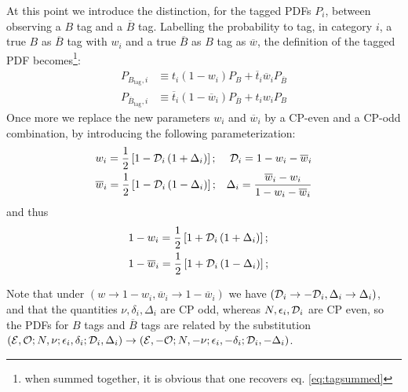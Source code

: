 \documentclass[a4paper,10pt,twosided]{article}
\begin{document}
At this point we introduce the distinction, for the tagged PDFs $P_i$, between observing a $B$ tag and a $\overline{B}$ tag.
Labelling the probability to tag, in category $i$, a true $B$ as $\overline{B}$ tag with $w_i$ and a true $\overline{B}$ as $B$ tag as $\overline{w}$,
the definition of the tagged PDF becomes\footnote{when summed together, it is obvious that one recovers eq. \ref{eq:tagsummed}}:
\begin{eqnarray}
   P_{B_\mathrm{tag},i} &\equiv t_i (1-w_i) P_{B} + \overline{t}_i\overline{w}_i P_{\overline{ B} }\\
   P_{\overline{B}_\mathrm{tag},i} &\equiv \overline{t}_i (1-\overline{w}_i) P_{\overline{B}} + t_i w_i P_{ B }
\label{eq:tagdef}
\end{eqnarray} 
Once more we replace the new parameters $w_i$ and $\overline{w}_i$ by a CP-even and a CP-odd combination, by introducing
the following parameterization:
\begin{eqnarray}
&w_i            = \frac{1}{2}\left[1-{\cal D}_i\left(1+{\Delta}_i\right) \right]; &  {\cal D}_i =1-w_i - \overline{w}_i \\
&\overline{w}_i = \frac{1}{2}\left[1-{\cal D}_i\left(1-{\Delta}_i\right) \right]; &  {\Delta}_i =  \frac{\overline{w}_i - w_i }{1-w_i-\overline{w}_i}\\
\end{eqnarray}
and thus
\begin{eqnarray}
   &1-w_i            = \frac{1}{2}\left[1+{\cal D}_i\left(1+{\Delta}_i\right) \right]; &
\\ &1-\overline{w}_i = \frac{1}{2}\left[1+{\cal D}_i\left(1-{\Delta}_i\right) \right]; &
\end{eqnarray}

Note that under $(w\rightarrow 1-w_i, \overline{w}_i\rightarrow 1-\overline{w}_i)$ we have $({\cal D}_i \rightarrow -{\cal D}_i,{\Delta}_i\rightarrow{\Delta}_i)$,
and that the quantities $\nu,\delta_i,{\Delta}_i$ are CP odd, whereas $N,\epsilon_i,{\cal D}_i$ are CP even, so the PDFs
for $B$ tags and $\overline{B}$ tags are related by the substitution $({\cal E},{\cal O};N,\nu;\epsilon_i,\delta_i;{\cal D}_i,\Delta_i )\rightarrow({\cal E},-{\cal O};N,-\nu;\epsilon_i,-\delta_i;{\cal D}_i,-\Delta_i )$.
\end{document}
